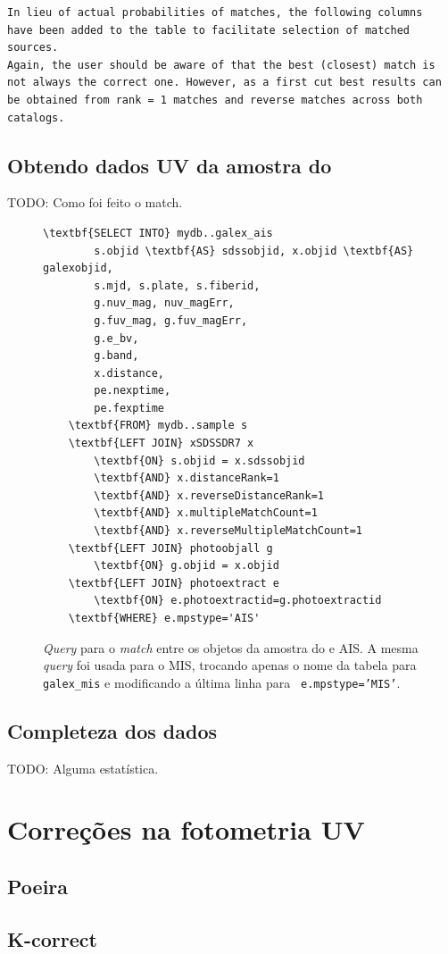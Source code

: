 \begin{verbatim}
In lieu of actual probabilities of matches, the following columns 
have been added to the table to facilitate selection of matched sources.
Again, the user should be aware of that the best (closest) match is 
not always the correct one. However, as a first cut best results can 
be obtained from rank = 1 matches and reverse matches across both 
catalogs.
\end{verbatim}

\subsection{Obtendo dados UV da amostra do \starlight}
TODO: Como foi feito o match.


\begin{figure}
	\begin{Verbatim}[commandchars=\\\{\}]
	\textbf{SELECT INTO} mydb..galex_ais
		s.objid \textbf{AS} sdssobjid, x.objid \textbf{AS} galexobjid,
		s.mjd, s.plate, s.fiberid,
		g.nuv_mag, nuv_magErr,
		g.fuv_mag, g.fuv_magErr,
		g.e_bv,
		g.band,
		x.distance,
		pe.nexptime,
		pe.fexptime
	\textbf{FROM} mydb..sample s
	\textbf{LEFT JOIN} xSDSSDR7 x
		\textbf{ON} s.objid = x.sdssobjid
		\textbf{AND} x.distanceRank=1
		\textbf{AND} x.reverseDistanceRank=1
		\textbf{AND} x.multipleMatchCount=1
		\textbf{AND} x.reverseMultipleMatchCount=1
	\textbf{LEFT JOIN} photoobjall g
		\textbf{ON} g.objid = x.objid
	\textbf{LEFT JOIN} photoextract e
		\textbf{ON} e.photoextractid=g.photoextractid
	\textbf{WHERE} e.mpstype='AIS'
	\end{Verbatim}
	\caption[{\em Query} para o {\em match} entre os objetos da amostra do
	\starlight e \galex AIS.]
	{{\em Query} para o {\em match} entre os objetos da amostra do \starlight e
	\galex AIS. A mesma {\em query} foi usada para o MIS, trocando apenas o nome da
	tabela para {\tt galex\_mis} e modificando a última linha para {\tt
	e.mpstype='MIS'}.}
	\label{fig:QueryMatchAIS}
\end{figure}

\subsection{Completeza dos dados}
TODO: Alguma estatística.


\section{Correções na fotometria UV}
\label{sec:Crossmatch:Correcoes}

\subsection{Poeira}

\subsection{K-correct}


